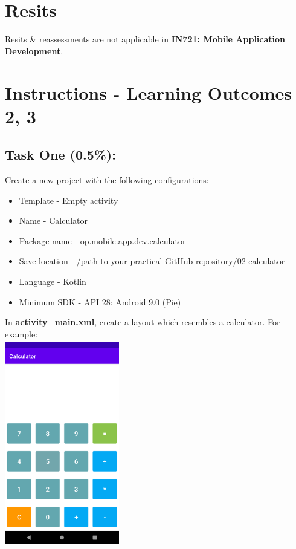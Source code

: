 \documentclass{article}
\begin{document}
\section*{Resits}
Resits \& reassessments are not applicable in \textbf{IN721: Mobile Application Development}.

\newpage

\section*{Instructions - Learning Outcomes 2, 3}

\subsection*{Task One (0.5\%):} 

Create a new project with the following configurations:
\begin{itemize}
	\item Template - Empty activity
	\item Name - Calculator
	\item Package name - op.mobile.app.dev.calculator
	\item Save location - /path to your practical GitHub repository/02-calculator
	\item Language - Kotlin
	\item Minimum SDK - API 28: Android 9.0 (Pie) 
\end{itemize} 

In \textbf{activity\_main.xml}, create a layout which resembles a calculator. For example: \\

\includegraphics[width=5cm, height=9cm]{../../resources/img/practicals/02-calculator-1.png}  \\
\end{document}
